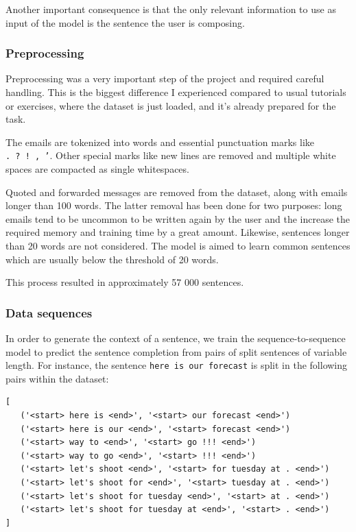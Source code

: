 \documentclass{article}
\begin{document}
Another important consequence is that the only relevant information to use as input of the model is the sentence the user is composing.

\subsubsection{Preprocessing}

Preprocessing was a very important step of the project and required careful handling. This is the biggest difference I experienced compared to usual tutorials or exercises, where the dataset is just loaded, and it's already prepared for the task.

The emails are tokenized into words and essential punctuation marks like \texttt{.\ ?\ !\ ,\ '}. Other special marks like new lines are removed and multiple white spaces are compacted as single whitespaces.

Quoted and forwarded messages are removed from the dataset, along with emails longer than 100 words. The latter removal has been done for two purposes: long emails tend to be uncommon to be written again by the user and the increase the required memory and training time by a great amount. Likewise, sentences longer than 20 words are not considered. The model is aimed to learn common sentences which are usually below the threshold of 20 words.

This process resulted in approximately 57 000 sentences.

\subsubsection{Data sequences}

In order to generate the context of a sentence, we train the sequence-to-sequence model to predict the sentence completion from pairs of split sentences of variable length. For instance, the sentence \texttt{here\ is\ our\ forecast} is split in the following pairs within the dataset:

\begin{lstlisting}
[
   ('<start> here is <end>', '<start> our forecast <end>')
   ('<start> here is our <end>', '<start> forecast <end>')
   ('<start> way to <end>', '<start> go !!! <end>')
   ('<start> way to go <end>', '<start> !!! <end>')
   ('<start> let's shoot <end>', '<start> for tuesday at . <end>')
   ('<start> let's shoot for <end>', '<start> tuesday at . <end>')
   ('<start> let's shoot for tuesday <end>', '<start> at . <end>')
   ('<start> let's shoot for tuesday at <end>', '<start> . <end>')
]
\end{lstlisting}
\end{document}
